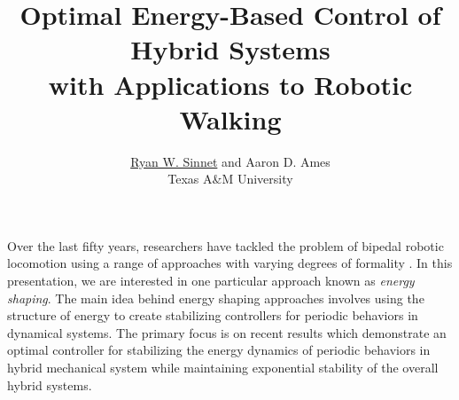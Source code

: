\documentclass[english]{article}
\begin{document}

\title{Optimal Energy-Based Control of Hybrid Systems\\ with Applications to
  Robotic Walking}

\author{\underline{Ryan W. Sinnet} and Aaron D. Ames \\
  Texas A\&M University}%


\date{}
\maketitle
\thispagestyle{empty}

Over the last fifty years, researchers have tackled the problem of bipedal
robotic locomotion using a range of approaches with varying degrees of
formality \cite{Grizzle2014}.
%
In this presentation, we are interested in one particular approach known as {\em
  energy shaping}.
%
The main idea behind energy shaping approaches involves using the structure
of energy to create stabilizing controllers for periodic behaviors in dynamical
systems.
%
The primary focus is on recent results \cite{Sinnet2015,Sinnet2015a} which
demonstrate an optimal controller for stabilizing the energy dynamics of
periodic behaviors in hybrid mechanical system while maintaining exponential
stability of the overall hybrid systems.
%
\end{document}
